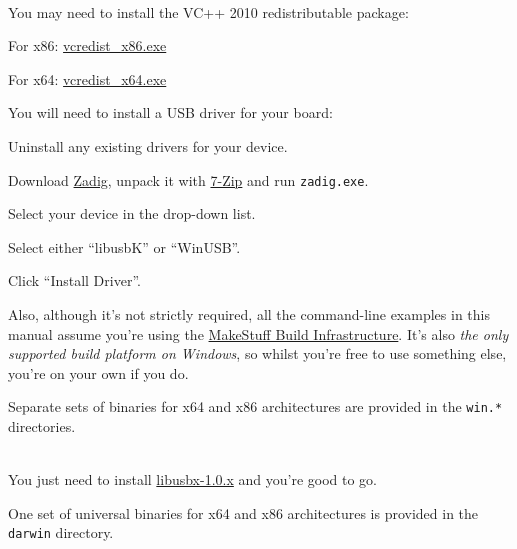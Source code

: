 \begin{desc}
  \item[\sffamily{Windows:}] \hfill \\
    You may need to install the VC++ 2010 redistributable package:
    \begin{blobs}
      \item
        For x86: \href{http://download.microsoft.com/download/5/B/C/5BC5DBB3-652D-4DCE-B14A-475AB85EEF6E/vcredist_x86.exe}{vcredist\_x86.exe}
      \item
        For x64:  \href{http://download.microsoft.com/download/3/2/2/3224B87F-CFA0-4E70-BDA3-3DE650EFEBA5/vcredist_x64.exe}{vcredist\_x64.exe}
    \end{blobs}
    You will need to install a USB driver for your board:
    \begin{blobs}
      \item
        Uninstall any existing drivers for your device.
      \item
        Download \href{http://sourceforge.net/projects/libwdi/files/zadig/}{Zadig}, unpack it with \href{http://www.7-zip.org/download.html}{7-Zip} and run \texttt{zadig.exe}.
      \item
        Select your device in the drop-down list.
      \item
        Select either ``libusbK'' or ``WinUSB''.
      \item
        Click ``Install Driver''.
    \end{blobs}
    Also, although it's not strictly required, all the command-line examples in this manual assume you're using the \href{http://www.makestuff.eu/wordpress/?page_id=1489}{MakeStuff Build Infrastructure}. It's also \textit{the only supported build platform on Windows}, so whilst you're free to use something else, you're on your own if you do.

    Separate sets of binaries for x64 and x86 architectures are provided in
    the \texttt{win.*} directories.
  \item[\sffamily{MacOSX:}] \hfill \\
    You just need to install \href{http://www.swaton.ukfsn.org/bin/libusbx-macosx}{libusbx-1.0.x} and you're good to go.

    One set of universal binaries for x64 and x86 architectures is provided in the \texttt{darwin} directory.
\end{desc}

